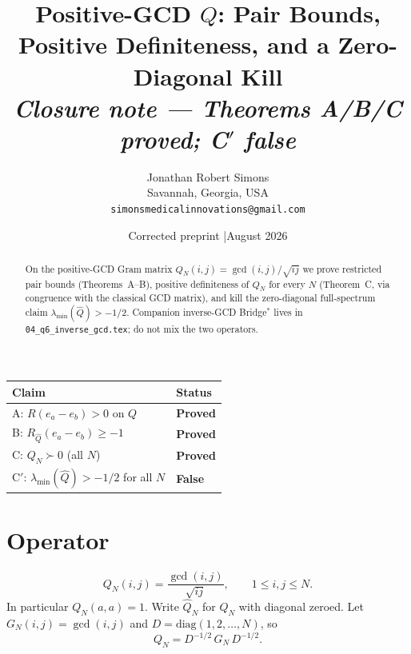 \documentclass[11pt]{article}
\title{\textbf{Positive-GCD $Q$: Pair Bounds,\\
Positive Definiteness, and a Zero-Diagonal Kill}\\[4pt]
\large\textit{Closure note --- Theorems A/B/C proved; C$'$ false}}
\author{Jonathan Robert Simons\\
Savannah, Georgia, USA\\
\texttt{simonsmedicalinnovations@gmail.com}}
\date{Corrected preprint \quad|\quad August 2026}
\begin{document}
\maketitle

\begin{center}
\end{center}

\vspace{0.5em}
\begin{center}
\begin{tabular}{>{\raggedright\arraybackslash}p{9cm}>{\centering\arraybackslash}p{3cm}}
\toprule
\textbf{Claim} & \textbf{Status}\\
\midrule
\rowcolor{lightgreen}
A: $R(e_a-e_b)>0$ on $Q$ & \textcolor{proved}{\textbf{Proved}}\\
\rowcolor{lightgreen}
B: $R_{\widehat Q}(e_a-e_b)\ge -1$ & \textcolor{proved}{\textbf{Proved}}\\
\rowcolor{lightgreen}
C: $Q_N\succ 0$ (all $N$) & \textcolor{proved}{\textbf{Proved}}\\
\rowcolor{lightred}
C$'$: $\lambda_{\min}(\widehat Q)>-1/2$ for all $N$ & \textcolor{killed}{\textbf{False}}\\
\bottomrule
\end{tabular}
\end{center}

\begin{abstract}
On the positive-GCD Gram matrix $Q_N(i,j)=\gcd(i,j)/\sqrt{ij}$ we prove
restricted pair bounds (Theorems~A--B), positive definiteness of $Q_N$ for every
$N$ (Theorem~C, via congruence with the classical GCD matrix), and kill the
zero-diagonal full-spectrum claim $\lambda_{\min}(\widehat Q)>-1/2$.
Companion inverse-GCD Bridge$^*$ lives in \texttt{04\_q6\_inverse\_gcd.tex};
do not mix the two operators.
\end{abstract}

\section{Operator}

\[
Q_N(i,j)=\frac{\gcd(i,j)}{\sqrt{ij}},\qquad 1\le i,j\le N.
\]
In particular $Q_N(a,a)=1$. Write $\widehat Q_N$ for $Q_N$ with diagonal zeroed.
Let $G_N(i,j)=\gcd(i,j)$ and $D=\mathrm{diag}(1,2,\ldots,N)$, so
\[
Q_N = D^{-1/2}\,G_N\,D^{-1/2}.
\]
\end{document}
